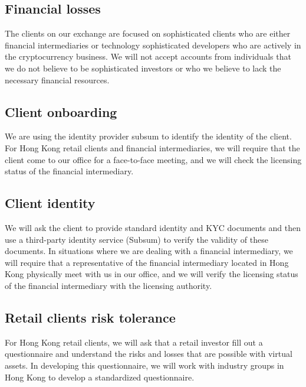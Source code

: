 \subsection{Financial losses}

The clients on our exchange are focused on sophisticated clients who
are either financial intermediaries or technology sophisticated
developers who are actively in the cryptocurrency business.  We will
not accept accounts from individuals that we do not believe to be
sophisticated investors or who we believe to lack the necessary financial
resources.

\subsection{Client onboarding}

We are using the identity provider subsum to identify the identity of
the client.  For Hong Kong retail clients and financial
intermediaries, we will require that the client come to our office for
a face-to-face meeting, and we will check the licensing status of the
financial intermediary.

\subsection{Client identity}
We will ask the client to provide standard identity and KYC documents
and then use a third-party identity service (Subsum) to verify the
validity of these documents.  In situations where we are dealing with
a financial intermediary, we will require that a representative of the
financial intermediary located in Hong Kong physically meet with us in
our office, and we will verify the licensing status of the financial
intermediary with the licensing authority.

\subsection{Retail clients risk tolerance}

For Hong Kong retail clients, we will ask that a retail investor fill
out a questionnaire and understand the risks and losses that are
possible with virtual assets.  In developing this questionnaire, we will
work with industry groups in Hong Kong to develop a standardized
questionnaire.

